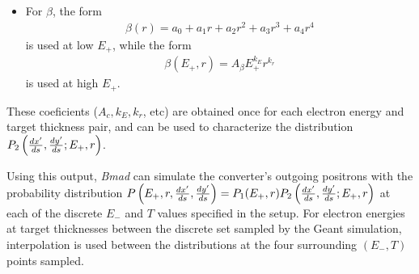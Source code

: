 \documentclass[12pt]{article}
\begin{document}
\begin{itemize}
\begin{itemize}
\item
For $\beta$, the form
\begin{align}
\beta(r) = a_0 + a_1 r + a_2 r^2 + a_3 r^3 + a_4 r^4
\end{align}
is used at low $E_+$, while the form
\begin{align}
\beta(E_+, r) = A_\beta E_+^{k_E} r^{k_r}
\end{align}
is used at high $E_+$.

\end{itemize}
These coeficients ($A_c, k_E, k_r$, etc) are obtained once for each electron energy and target thickness pair, and can be used to characterize the distribution $P_2 \left( \frac{dx'}{ds}, \frac{dy'}{ds}; E_+, r \right)$.

\end{itemize}

Using this output, \textit{Bmad} can simulate the converter's outgoing positrons with the probability distribution $P\left( E_+, r, \frac{dx'}{ds}, \frac{dy'}{ds} \right) = P_1(E_+, r) P_2 \left( \frac{dx'}{ds}, \frac{dy'}{ds}; E_+, r \right)$ at each of the discrete $E_-$ and $T$ values specified in the setup.
For electron energies at target thicknesses between the discrete set sampled by the Geant simulation, interpolation is used between the distributions at the four surrounding $(E_-, T)$ points sampled.



\printbibliography
\end{document}
